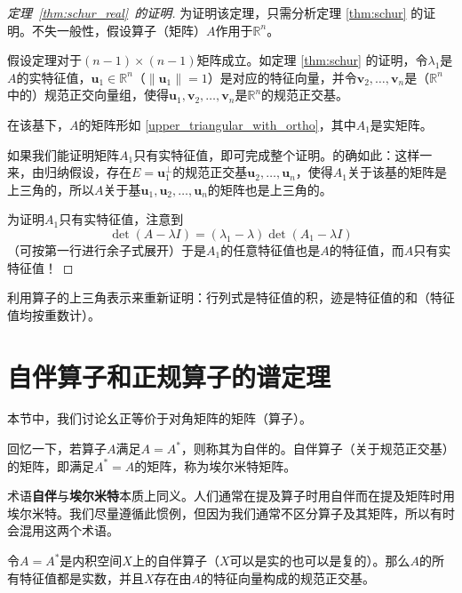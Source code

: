 \begin{proof}[定理~\ref{thm:schur_real}~的证明]
    为证明该定理，只需分析定理 \ref{thm:schur} 的证明。不失一般性，假设算子（矩阵）$A$作用于$\mathbb{R}^n$。

    假设定理对于$(n-1)\times (n-1)$矩阵成立。如定理 \ref{thm:schur} 的证明，令$\lambda_1$是$A$的实特征值，$\mathbf{u}_1\in\mathbb{R}^n$（$\|\mathbf{u}_1\|=1$）是对应的特征向量，并令$\mathbf{v}_{2},\ldots,\mathbf{v}_{n}$是（$\mathbb{R}^n$中的）规范正交向量组，使得$\mathbf{u}_1,\mathbf{v}_{2},\ldots,\mathbf{v}_{n}$是$\mathbb{R}^n$的规范正交基。
    
    在该基下，$A$的矩阵形如 \eqref{upper_triangular_with_ortho}，其中$A_1$是实矩阵。

    如果我们能证明矩阵$A_1$只有实特征值，即可完成整个证明。的确如此：这样一来，由归纳假设，存在$E=\mathbf{u}_1^\perp$的规范正交基$\mathbf{u}_{2},\ldots,\mathbf{u}_{n}$，使得$A_1$关于该基的矩阵是上三角的，所以$A$关于基$\mathbf{u}_1,\mathbf{u}_{2},\ldots,\mathbf{u}_{n}$的矩阵也是上三角的。

    为证明$A_1$只有实特征值，注意到\[\det(A-\lambda I)=(\lambda_1-\lambda)\det(A_1-\lambda I)\]
    （可按第一行进行余子式展开）于是$A_1$的任意特征值也是$A$的特征值，而$A$只有实特征值！
\end{proof}

\begin{problemset}
    \item 利用算子的上三角表示来重新证明：行列式是特征值的积，迹是特征值的和（特征值均按重数计）。
\end{problemset}

\section{自伴算子和正规算子的谱定理}

本节中，我们讨论幺正等价于对角矩阵的矩阵（算子）。

回忆一下，若算子$A$满足$A=A^*$，则称其为自伴的。自伴算子（关于规范正交基）的矩阵，即满足$A^*=A$的矩阵，称为埃尔米特矩阵。

术语{\bf 自伴}与{\bf 埃尔米特}本质上同义。人们通常在提及算子时用自伴而在提及矩阵时用埃尔米特。我们尽量遵循此惯例，但因为我们通常不区分算子及其矩阵，所以有时会混用这两个术语。

\begin{theorem}\label{thm:self_adjoint_operator_real_eig}
    令$A=A^*$是内积空间$X$上的自伴算子（$X$可以是实的也可以是复的）。那么$A$的所有特征值都是实数，并且$X$存在由$A$的特征向量构成的规范正交基。
\end{theorem}

